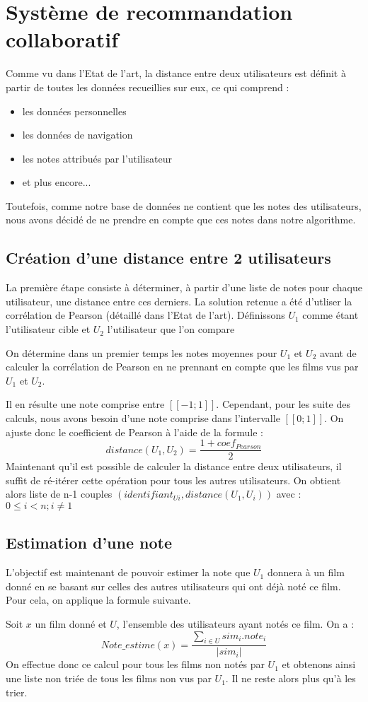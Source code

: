 \section{Système de recommandation collaboratif}
Comme vu dans l'Etat de l'art, la distance entre deux utilisateurs est définit à partir de toutes les données recueillies sur eux, ce qui comprend :
\begin{itemize}
	\item les données personnelles
	\item les données de navigation
	\item les notes attribués par l'utilisateur
	\item et plus encore...
\end{itemize}
Toutefois, comme notre base de données ne contient que les notes des utilisateurs, nous avons décidé de ne prendre en compte que ces notes dans notre algorithme.

\subsection{Création d'une distance entre 2 utilisateurs}
La première étape consiste à déterminer, à partir d'une liste de notes pour chaque utilisateur, une distance entre ces derniers. La solution retenue a été d'utliser la corrélation de Pearson (détaillé dans l'Etat de l'art). Définissons $U_{1}$ comme étant l'utilisateur cible et $U_{2}$ l'utilisateur que l'on compare\par
On détermine dans un premier temps les notes moyennes pour $U_{1}$ et $U_{2}$ avant de calculer la corrélation de Pearson en ne prennant en compte que les films vus par $U_{1}$ et $U_{2}$.\par
Il en résulte une note comprise entre $[\![-1;1]\!]$. Cependant, pour les suite des calculs, nous avons besoin d'une note comprise dans l'intervalle $[\![0;1]\!]$. On ajuste donc le coefficient de Pearson à l'aide de la formule :
$$distance(U_1, U_2) = \frac{1 + coef_{Pearson}}{2}$$
Maintenant qu'il est possible de calculer la distance entre deux utilisateurs, il suffit de ré-itérer cette opération pour tous les autres utilisateurs. On obtient alors liste de n-1 couples ${(identifiant_{Ui}, distance(U_1, U_i))}$ avec : $0 \leqslant i < n  ;  i\neq1$
\subsection{Estimation d'une note}
L'objectif est maintenant de pouvoir estimer la note que $U_1$ donnera à un film donné en se basant sur celles des autres utilisateurs qui ont déjà noté ce film. Pour cela, on applique la formule suivante.\par
Soit $x$ un film donné et $U$, l'ensemble des utilisateurs ayant notés ce film. On a :
$$Note\_estime(x) = \frac{\sum_{i\in{U}} sim_i.note_i}{|sim_i|}$$
On effectue donc ce calcul pour tous les films non notés par $U_{1}$ et obtenons ainsi une liste non triée de tous les films non vus par $U_{1}$. Il ne reste alors plus qu'à les trier.

